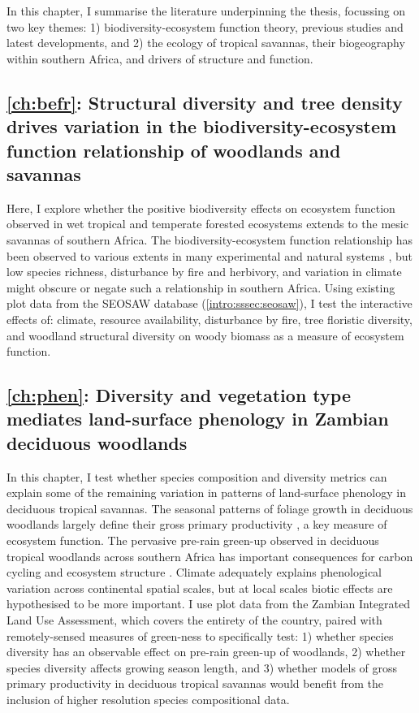 \begin{refsection}
In this chapter, I summarise the literature underpinning the thesis, focussing on two key themes: 1) biodiversity-ecosystem function theory, previous studies and latest developments, and 2) the ecology of tropical savannas, their biogeography within southern Africa, and drivers of structure and function.

\subsection{\autoref{ch:befr}: Structural diversity and tree density drives variation in the biodiversity-ecosystem function relationship of woodlands and savannas}
\label{intro:ssec:ch:befr}

Here, I explore whether the positive biodiversity effects on ecosystem function observed in wet tropical and temperate forested ecosystems extends to the mesic savannas of southern Africa. The biodiversity-ecosystem function relationship has been observed to various extents in many experimental and natural systems \citep{Tilman2014, Plas2019}, but low species richness, disturbance by fire and herbivory, and variation in climate might obscure or negate such a relationship in southern Africa. Using existing plot data from the SEOSAW database (\autoref{intro:sssec:seosaw}), I test the interactive effects of: climate, resource availability, disturbance by fire, tree floristic diversity, and woodland structural diversity on woody biomass as a measure of ecosystem function.

\subsection{\autoref{ch:phen}: Diversity and vegetation type mediates land-surface phenology in Zambian deciduous woodlands}
\label{intro:ssec:ch:phen}

In this chapter, I test whether species composition and diversity metrics can explain some of the remaining variation in patterns of land-surface phenology in deciduous tropical savannas. The seasonal patterns of foliage growth in deciduous woodlands largely define their gross primary productivity \citep{Penuelas2009}, a key measure of ecosystem function. The pervasive pre-rain green-up observed in deciduous tropical woodlands across southern Africa \citep{Ryan2016} has important consequences for carbon cycling and ecosystem structure \citep{Xia2015}. Climate adequately explains phenological variation across continental spatial scales, but at local scales biotic effects are hypothesised to be more important. I use plot data from the Zambian Integrated Land Use Assessment, which covers the entirety of the country, paired with remotely-sensed measures of green-ness to specifically test: 1) whether species diversity has an observable effect on pre-rain green-up of woodlands, 2) whether species diversity affects growing season length, and 3) whether models of gross primary productivity in deciduous tropical savannas would benefit from the inclusion of higher resolution species compositional data.


\end{refsection}
